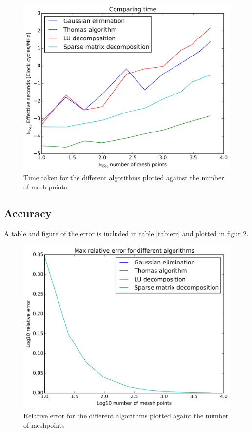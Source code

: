 \documentclass[11pt,a4paper,english]{article}
\numberwithin{equation}{section}
\begin{document}
\begin{figure}[H]
\centering
  \includegraphics[scale=0.45]{Results/n_time.png}
  \caption{Time taken for the different algorithms plotted against 
  the number of mesh points}
  \label{fig:time}
\end{figure}


\subsection{Accuracy}

A table and figure of the error is included in table \ref{tab:err} 
and plotted in figur \ref{fig:err}. 

\begin{figure}[H]
\centering
  \includegraphics[scale=0.45]{Results/n_err.png}
  \caption{Relative error for the different algorithms plotted 
  againt the number of meshpoints }
  \label{fig:err}
\end{figure}
\end{document}

